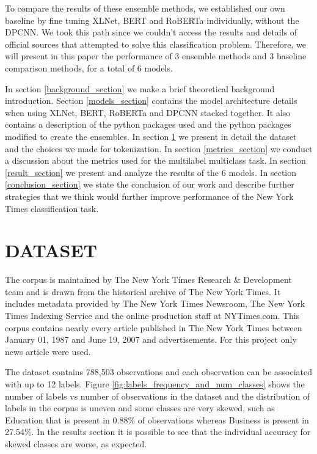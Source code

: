 \documentclass{article}
\begin{document}
To compare the results of these ensemble methods, we established our own baseline by fine tuning XLNet, BERT and RoBERTa individually, without the DPCNN. We took this path since we couldn’t access the results and details of official sources that attempted to solve this classification problem. Therefore, we will present in this paper the performance of 3 ensemble methods and 3 baseline comparison methods, for a total of 6 models.

In section \ref{background_section} we make a brief theoretical background introduction. Section \ref{models_section} contains the model architecture details when using XLNet, BERT, RoBERTa and DPCNN stacked together.  It also contains a description of the python packages used and the python packages modified to create the ensembles. In section \ref{dataset_section}  we present in detail the dataset and the choices we made for tokenization. In section \ref{metrics_section} we conduct a discussion about the metrics used for the multilabel multiclass task. In section \ref{result_section} we present and analyze the results of the 6 models. In section \ref{conclusion_section} we state the conclusion of our work and describe further strategies that we think would further improve performance of the New York Times classification task.

\section{DATASET} \label{dataset_section}

The corpus is maintained by The New York Times Research \& Development team and is  drawn from the historical archive of The New York Times. It includes metadata provided by The New York Times Newsroom, The New York Times Indexing Service and the online production staff at NYTimes.com. This corpus contains nearly every article published in The New York Times between January 01, 1987 and June 19, 2007\cite{nyt_corpus_ref} and advertisements. For this project only news article were used.

The dataset contains 788,503 observations and each observation can be associated with up to 12 labels. Figure \ref{fig:labels_frequency_and_num_classes} shows the number of labels vs number of observations in the dataset and the distribution of labels in the corpus is uneven and some classes are very skewed, such as Education that is present in 0.88\% of observations whereas Business is present in 27.54\%. In the results section it is possible to see that the individual accuracy for skewed classes are worse, as expected.
\end{document}
